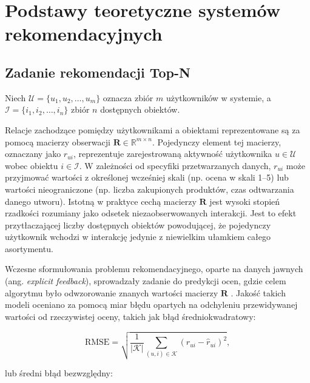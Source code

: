 \chapter{Podstawy teoretyczne systemów rekomendacyjnych}

\section{Zadanie rekomendacji Top-N}
\label{sec:top_n_formulation}

Niech $\mathcal{U} = \{u_1, u_2, \dots, u_m\}$ oznacza zbiór $m$ użytkowników w systemie, a $\mathcal{I} = \{i_1, i_2, \dots, i_n\}$ zbiór $n$ dostępnych obiektów.

Relacje zachodzące pomiędzy użytkownikami a obiektami reprezentowane są za pomocą macierzy obserwacji $\mathbf{R} \in \mathbb{R}^{m \times n}$. Pojedynczy element tej macierzy, oznaczany jako $r_{ui}$, reprezentuje zarejestrowaną aktywność użytkownika $u \in \mathcal{U}$ wobec obiektu $i \in \mathcal{I}$. W zależności od specyfiki przetwarzanych danych, $r_{ui}$ może przyjmować wartości z określonej wcześniej skali (np. ocena w skali 1--5) lub wartości nieograniczone (np. liczba zakupionych produktów, czas odtwarzania danego utworu). Istotną w praktyce cechą macierzy $\mathbf{R}$ jest wysoki stopień rzadkości rozumiany jako odsetek niezaobserwowanych interakcji. Jest to efekt przytłaczającej liczby dostępnych obiektów powodującej, że pojedynczy użytkownik wchodzi w interakcję jedynie z niewielkim ułamkiem całego asortymentu.

Wczesne sformułowania problemu rekomendacyjnego, oparte na danych jawnych (ang. \textit{explicit feedback}), sprowadzały zadanie do predykcji ocen, gdzie celem algorytmu było odwzorowanie znanych wartości macierzy $\mathbf{R}$ \cite{aggarwal2016recommender}. Jakość takich modeli oceniano za pomocą miar błędu opartych na odchyleniu przewidywanej wartości od rzeczywistej oceny, takich jak błąd średniokwadratowy:

\begin{equation}
    \text{RMSE} = \sqrt{\frac{1}{|\mathcal{K}|} \sum_{(u,i) \in \mathcal{K}} \left(r_{ui} - \hat{r}_{ui}\right)^2},
\end{equation}

lub średni błąd bezwzględny:

